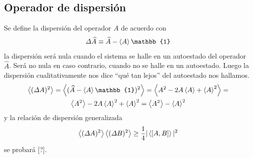 \documentclass[10pt,oneside]{CBFT_book}
\begin{document}

\subsection{Operador de dispersión}

Se define la dispersión del operador $A$ de acuerdo con
\[
	\Delta \widehat{A} \equiv \widehat{A} - \Braket{A}\mathbb{1}
\]
la dispersión será nula cuando el sistema se halle en un autoestado del operador $\widehat{A}$. 
Será no nula en caso contrario, cuando no se halle en un autoestado.
Luego la dispersión cualitativamente nos dice ``qué tan lejos'' del autoestado nos hallamos.
\begin{multline*}
	\Braket{(\Delta A)^2} = \Braket{(\widehat{A} - \Braket{A}\mathbb{1})^2} =
	\Braket{ A^2 - 2A\Braket{A} + \Braket{A}^2 } = \\
	\Braket{A^2} - 2A\Braket{A}^2 + \Braket{A}^2 = \Braket{A^2} - \Braket{A}^2
\end{multline*}
y la relación de dispersión generalizada
\[
	\Braket{(\Delta A)^2} \Braket{(\Delta B)^2} \geq \frac{1}{4}|\Braket{[ A,B ]}|^2
\]
se probará [?].
\end{document}
